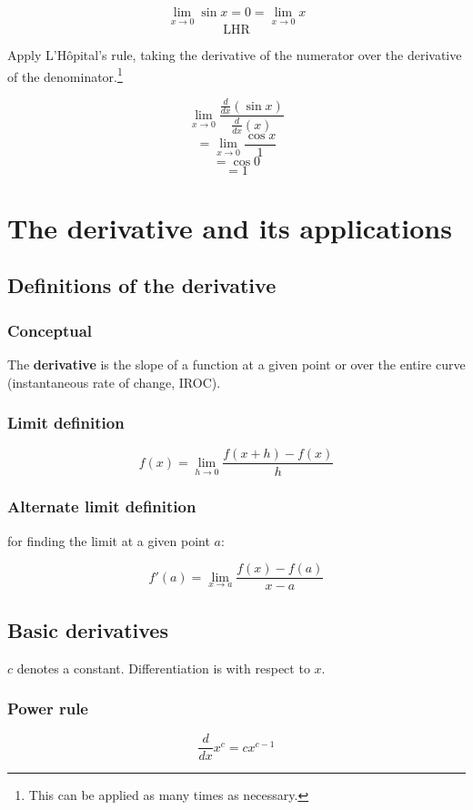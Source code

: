 \documentclass[letterpaper, 12pt]{article}
\begin{document}
$$\lim_{x \to 0}{\sin x} = 0 = \lim_{x \to 0}{x}$$
$$\mathrm{LHR}$$

Apply L'Hôpital's rule, taking the derivative of the numerator over the derivative of the denominator.\footnote{This can be applied as many times as necessary.}

$$ \lim_{x \to 0} \frac{\frac{d}{dx}(\sin x)}{\frac{d}{dx}(x)}$$  
$$ = \lim_{x \to 0} \frac{\cos x}{1} $$
$$ = \cos 0$$
$$ = \boxed{1} $$

\section*{The derivative and its applications}

\subsection*{Definitions of the derivative}

\subsubsection*{Conceptual}
The \textbf{derivative} is the slope of a function at a given point or over the entire curve (instantaneous rate of change, IROC).

\subsubsection*{Limit definition}

$$f(x) = \lim_{h \to 0} \frac{f(x+h)-f(x)}{h}$$

\subsubsection*{Alternate limit definition}
for finding the limit at a given point $a$:

$$f'(a) = \lim_{x \to a} \frac{f(x)-f(a)}{x-a}$$

\subsection*{Basic derivatives}

$c$ denotes a constant. Differentiation is with respect to $x$.

\subsubsection*{Power rule}
$$\frac{d}{dx} x^c = cx^{c-1}$$
\end{document}

